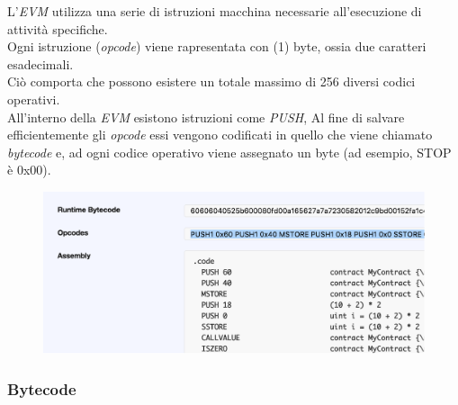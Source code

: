 \documentclass[11pt]{thesistemp}
\begin{document}
L'\textit{EVM} utilizza una serie di istruzioni macchina necessarie all'esecuzione di attività specifiche.\\
Ogni istruzione (\textit{opcode}) viene rapresentata con (1) byte, ossia due caratteri esadecimali.\\
Ciò comporta che possono esistere un totale massimo di 256 diversi codici operativi.\\
All'interno della \textit{EVM} esistono istruzioni come \textit{PUSH}, 
Al fine di salvare efficientemente gli \textit{opcode} essi vengono codificati in quello che viene chiamato \textit{bytecode} e, ad ogni codice operativo viene assegnato un byte (ad esempio, STOP è 0x00).\\
\begin{figure}[h]
    \centering
    \includegraphics[scale=.5]{bytecode-opcode.png}
    \label{fig:bytecode-opcode}
\end{figure}
\linebreak

\subsubsection{Bytecode}
\end{document}

